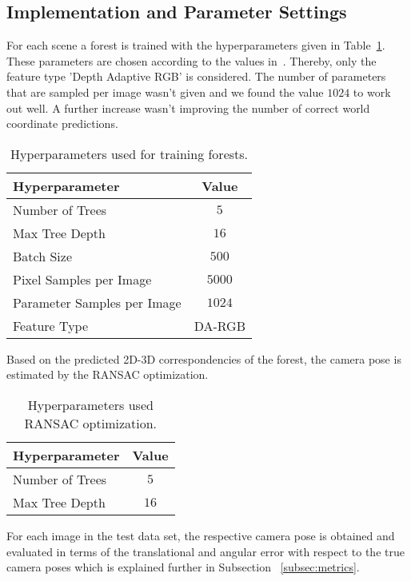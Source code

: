 \documentclass[final]{cvpr}
\begin{document}
\subsection{Implementation and Parameter Settings}
For each scene a forest is trained with the hyperparameters given in Table~\ref{tab:params-forest}. These parameters are 
chosen according to the values in~\cite{shotton2013}. Thereby, only the feature type 'Depth Adaptive RGB' is considered. The number of 
parameters that are sampled per image wasn't given and we found the value $1024$ to work out well. A further increase wasn't 
improving the number of correct world coordinate predictions.
\begin{table}[h!]
	\begin{center}
	\begin{tabular}{|l|c|}
	\hline
	Hyperparameter & Value \\
	\hline\hline
	Number of Trees & $5$ \\
	Max Tree Depth & $16$ \\
	Batch Size & $500$ \\
	Pixel Samples per Image & $5000$ \\
	Parameter Samples per Image  & $1024$ \\
	Feature Type & DA-RGB \\
	\hline
	\end{tabular}
	\end{center}
	\label{tab:params-forest}
	\caption{Hyperparameters used for training forests.}
\end{table}



Based on the predicted 2D-3D correspondencies of the forest, the camera pose is estimated by the RANSAC optimization.
\begin{table}[h!]
	\begin{center}
	\begin{tabular}{|l|c|}
	\hline
	Hyperparameter & Value \\
	\hline\hline
	Number of Trees & $5$ \\
	Max Tree Depth & $16$ \\
	\hline
	\end{tabular}
	\end{center}
	\label{tab:params-ransac}
	\caption{Hyperparameters used RANSAC optimization.}
\end{table}


For each image in the test data set, the respective camera pose is obtained and evaluated in terms of the translational 
and angular error with respect to the true camera poses which is explained further in Subsection ~\ref{subsec:metrics}.
 
\end{document}

